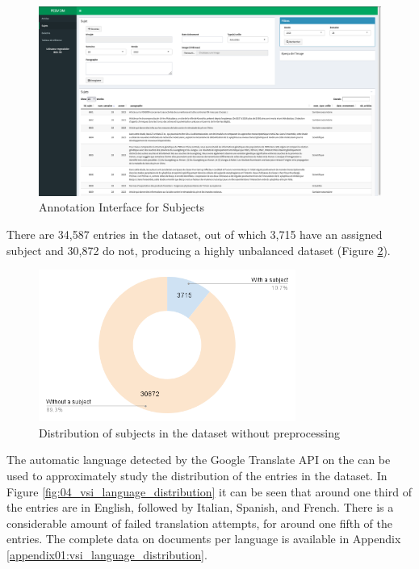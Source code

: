 \begin{landscape}
    \begin{figure}[ht]
        \centering
        \includegraphics[width=1.20\textwidth]{Figures/04/PESV_interface_2.png}
        \caption{\VSI{} Annotation Interface for Subjects}
        \label{fig:04_pesv_interface_2}
    \end{figure}
\end{landscape}


\label{vsi_data_statistics}

There are 34,587 entries in the dataset, out of which 3,715 have an assigned subject and 30,872 do not, producing a highly unbalanced dataset (Figure \ref{fig:04_naive_positives_and_negatives}). 

\begin{figure}
    \centering
    \includegraphics[width=0.75\textwidth]{Figures/04/naive_positives_and_negatives_chart.png}
    \caption{Distribution of subjects in the \VSI{} dataset without preprocessing}
    \label{fig:04_naive_positives_and_negatives}
\end{figure}

The automatic language detected by the Google Translate API on the \trafilaturaTitle{} can be used to approximately study the distribution of the entries in the dataset. In Figure \ref{fig:04_vsi_language_distribution} it can be seen that around one third of the entries are in English, followed by Italian, Spanish, and French. There is a considerable amount of failed translation attempts, for around one fifth of the entries. The complete data on documents per language is available in Appendix \ref{appendix01:vsi_language_distribution}.
 
